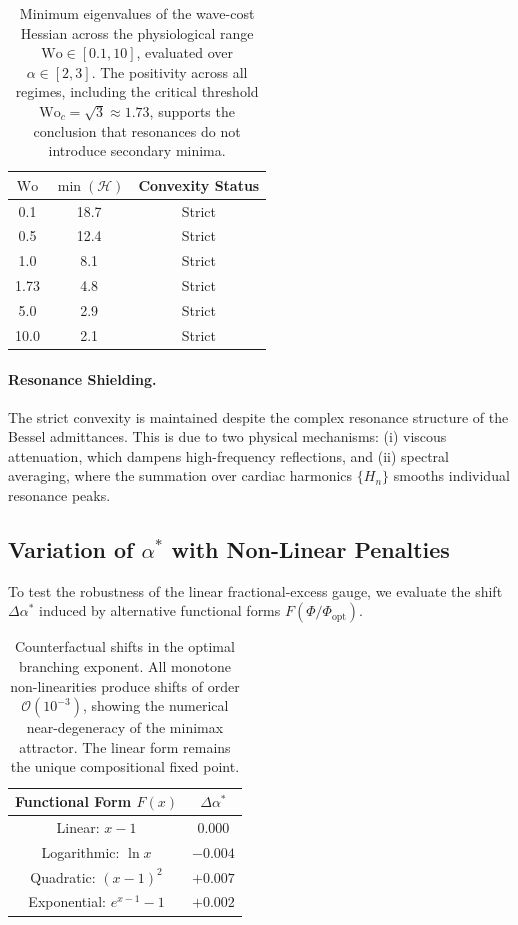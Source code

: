 \documentclass[11pt,a4paper]{article}
\theoremstyle{remark}
\begin{document}
\begin{table}[!htbp]
\centering
\caption{Minimum eigenvalues of the wave-cost Hessian across the
physiological range $\mathrm{Wo}\in[0.1,10]$, evaluated over
$\alpha\in[2,3]$. The positivity across all regimes, including the
critical threshold $\mathrm{Wo}_c = \sqrt{3} \approx 1.73$, supports the conclusion
that resonances do not introduce secondary minima.}
\label{tab:hessian}
\smallskip
\begin{tabular}{ccc}
\toprule
$\mathrm{Wo}$ & $\min(\mathcal{H})$ & Convexity Status \\
\midrule
0.1  & 18.7 & Strict \\
0.5  & 12.4 & Strict \\
1.0  &  8.1 & Strict \\
1.73 &  4.8 & Strict \\
5.0  &  2.9 & Strict \\
10.0 &  2.1 & Strict \\
\bottomrule
\end{tabular}
\end{table}

\paragraph{Resonance Shielding.}
The strict convexity is maintained despite the complex resonance structure of
the Bessel admittances. This is due to two physical mechanisms: (i) viscous
attenuation, which dampens high-frequency reflections, and (ii) spectral
averaging, where the summation over cardiac harmonics $\{H_n\}$ smooths
individual resonance peaks.

\subsection{Variation of $\alpha^*$ with Non-Linear Penalties}
\label{sec:S7_penalties}

To test the robustness of the linear fractional-excess gauge, we evaluate the
shift $\Delta \alpha^*$ induced by alternative functional forms
$F(\Phi/\Phi_{\mathrm{opt}})$.

\begin{table}[!htbp]
\centering
\caption{Counterfactual shifts in the optimal branching exponent. All
monotone non-linearities produce shifts of order $\mathcal{O}(10^{-3})$,
showing the numerical near-degeneracy of the minimax attractor. The linear
form remains the unique compositional fixed point.}
\label{tab:counterfactual}
\smallskip
\begin{tabular}{cc}
\toprule
\textbf{Functional Form} $F(x)$ & $\Delta \alpha^*$ \\
\midrule
Linear: $x-1$ & $0.000$ \\
Logarithmic: $\ln x$ & $-0.004$ \\
Quadratic: $(x-1)^2$ & $+0.007$ \\
Exponential: $e^{x-1}-1$ & $+0.002$ \\
\bottomrule
\end{tabular}
\end{table}



\end{document}
